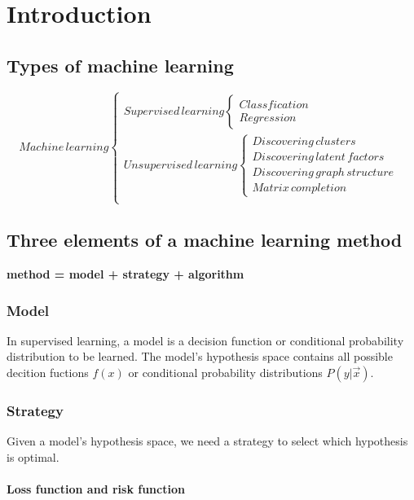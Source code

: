 \chapter{Introduction}

\section{Types of machine learning}
\begin{equation}\nonumber
Machine\, learning\begin{cases}
Supervised\, learning \begin{cases} Classfication\, \\ Regression \end{cases}\\
Unsupervised\, learning \begin{cases} Discovering\, clusters\, \\ Discovering\, latent\, factors\, \\ Discovering\, graph\, structure\, \\ Matrix\, completion \end{cases}\\
\end{cases}
\end{equation}

\section{Three elements of a machine learning method}

\textbf{method = model + strategy + algorithm}

\subsection{Model}
In supervised learning, a model is a decision function or conditional probability distribution  to be learned. The model's hypothesis space contains all possible decition fuctions $f(x)$ or conditional probability distributions $P(y|\vec{x})$.

\subsection{Strategy}
Given a model's hypothesis space, we need a strategy to select which hypothesis is optimal.

\subsubsection{Loss function and risk function}

